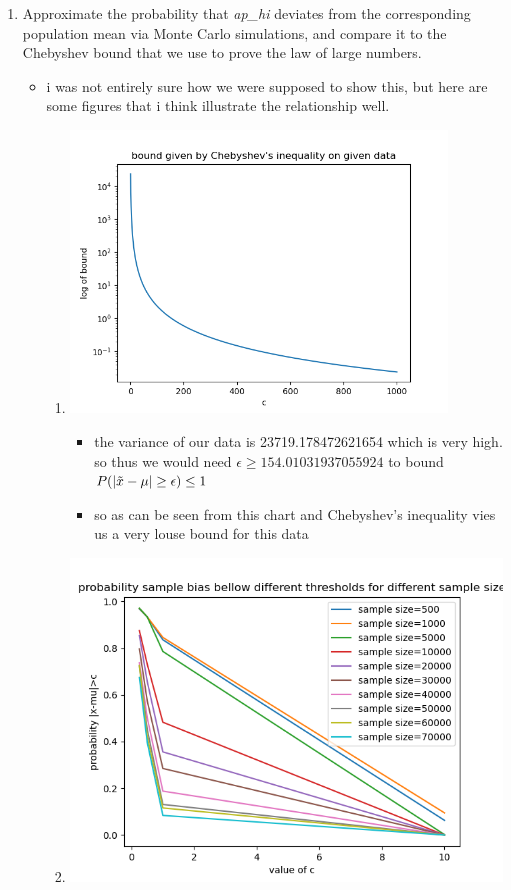 \documentclass[12pt,twoside]{article}
\begin{document}
\begin{enumerate}
\begin{enumerate}
\item Approximate the probability that \textit{ap\_hi} deviates from the corresponding population mean via Monte Carlo simulations, and compare it to the Chebyshev bound that we use to prove the law of large numbers.
\begin{itemize}
\item i was not entirely sure how we were supposed to show this, but here are some figures that i think illustrate the relationship well.
\begin{enumerate}
    \item \includegraphics[width=10cm]{homework/homework_3/immages/Figure_4.png}
    \begin{itemize}
        \item the variance of our data is 23719.178472621654 which is very high. so thus we would need $\epsilon\geq154.01031937055924$ to bound $P(|\Tilde{x}-\mu|\geq \epsilon)\leq 1$
        \item so as can  be seen from this chart and Chebyshev's inequality vies us a very louse bound for this data  
    \end{itemize}
    \item \includegraphics[width=12cm]{homework/homework_3/immages/Figure_3.png}

\end{enumerate}
\end{itemize}
\end{enumerate}
\end{enumerate}
\end{document}
